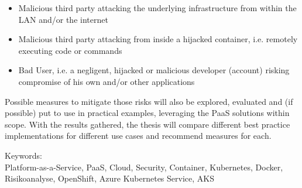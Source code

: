 \begin{itemize}

\item Malicious third party attacking the underlying infrastructure from within the LAN and/or the
internet

\item Malicious third party attacking from inside a hijacked container, i.e. remotely executing code
or commands

\item Bad User, i.e. a negligent, hijacked or malicious developer (account) risking compromise of
his own and/or other applications

\end{itemize}

Possible measures to mitigate those risks will also be explored, evaluated and (if possible) put to use
in practical examples, leveraging the PaaS solutions within scope. With the results gathered, the
thesis will compare different best practice implementations for different use cases and recommend
measures for each.

\bigskip

\noindent
Keywords: \\
Platform-as-a-Service, PaaS, Cloud, Security, Container, Kubernetes, Docker, Risikoanalyse, OpenShift, Azure Kubernetes Service, AKS

